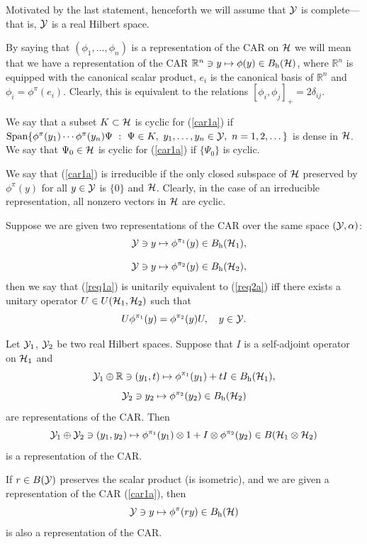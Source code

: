 \documentclass{svmult}
\newcommand{\bea}{\begin{eqnarray}}
\newcommand{\eea}{\end{eqnarray}}
\def\rr{{\mathbb R}}
\def\h{{\rm h}}
\def\cY{{\cal Y}}
\def\Span{{\rm Span}}
\def\one{{\bf 1}}
\def\cH{{\cal H}}
\def\one{{ 1}}
\def\cH{{\cal H}}
\begin{document}
Motivated by the last statement, henceforth we will assume that $\cY$
is complete---that is, $\cY$ is a real Hilbert space.


By saying that $(\phi_1,\dots,\phi_n)$ is a representation of the 
CAR on $\cH$ we
 will mean that we have a representation of the CAR
 $\rr^n\ni y\mapsto\phi(y)\in B_\h(\cH)$, where
 $\rr^n$ is equipped with the
 canonical scalar product,   $e_i$ is the canonical basis of
 $\rr^n$ and 
 $\phi_i=\phi^\pi(e_i)$. Clearly, this is equivalent to the relations
$[\phi_i,\phi_j]_+=2\delta_{ij}$.





We say that a subset $K\subset\cH$ is cyclic for (\ref{car1a})
if $\Span\{\phi^\pi(y_1)\cdots\phi^\pi(y_n)\Psi\ :\ 
\Psi\in K,\ y_1,\dots,y_n\in\cY,\ n=1,2,\dots\}$ is dense in $\cH$. We say that $\Psi_0\in\cH$
is cyclic
for (\ref{car1a})
if  $\{\Psi_0\}$ is cyclic.

We say that (\ref{car1a}) is irreducible if 
 the only closed subspace of $\cH$ preserved by $\phi^\pi(y)$
 for all $y\in\cY$ is $\{0\}$ and $\cH$.
Clearly, in the case of an
irreducible representation, all  nonzero vectors in $\cH$ are cyclic.



Suppose we are given two representations of the CAR over the same
 space $(\cY,\alpha)$:
\bea
&&\cY\ni y\mapsto \phi^{\pi_1}(y)\in B_\h(\cH_1),\label{req1a}\\[3mm]
&&\cY\ni y\mapsto \phi^{\pi_2}(y)\in B_\h(\cH_2),\label{req2a}
\eea
then
we say that (\ref{req1a}) is unitarily equivalent to (\ref{req2a}) iff there
exists a unitary operator $U\in U(\cH_1,\cH_2)$ such that
\[U\phi^{\pi_1}(y)=\phi^{\pi_2}(y)U,\ \ \ y\in \cY.\]












Let $\cY_1$, $\cY_2$ be 
two real Hilbert spaces. Suppose that  $I$ is a self-adjoint operator on
$\cH_1$  and
\[\cY_1\oplus\rr\ni(y_1,t)\mapsto \phi^{\pi_1}(y_1)+tI\in B_\h(\cH_1),\]
\[\cY_2\ni y_2\mapsto \phi^{\pi_2}(y_2)\in B_\h(\cH_2)\]
are representations of the CAR. Then
\[\cY_1\oplus\cY_2\ni(y_1,y_2)\mapsto
\phi^{\pi_1}(y_1)\otimes\one+I\otimes \phi^{\pi_2}(y_2)
\in
B(\cH_1\otimes\cH_2) \] is a representation of the CAR.

If $r\in B(\cY)$ preserves  
the scalar product (is  isometric), and we are given a representation of the CAR
(\ref{car1a}), then  
\[\cY\ni y\mapsto \phi^\pi(ry)\in B_\h(\cH)\]
is also  a representation of the CAR.
\end{document}
